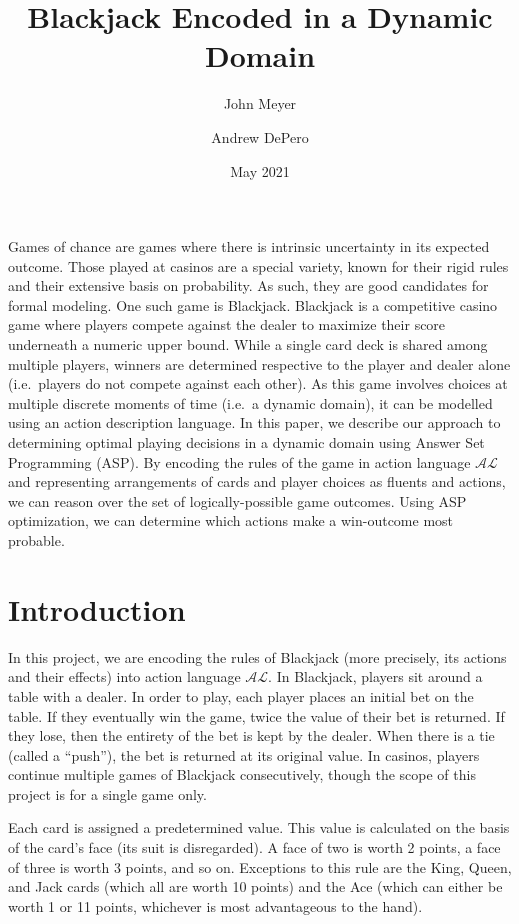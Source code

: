 \documentclass{article}
\title{Blackjack Encoded in a Dynamic Domain}
\author{
    John Meyer
    \and
    Andrew DePero
}
\date{May 2021}
\begin{document}
\maketitle

\noindent
Games of chance are games where there is intrinsic uncertainty in its expected outcome.
Those played at casinos are a special variety, known for their rigid rules and their extensive basis on probability.
As such, they are good candidates for formal modeling.
One such game is Blackjack.
Blackjack is a competitive casino game where players compete against the dealer to maximize their score underneath a numeric upper bound.
While a single card deck is shared among multiple players, winners are determined respective to the player and dealer alone (i.e.~players do not compete against each other).
As this game involves choices at multiple discrete moments of time (i.e.~a dynamic domain), it can be modelled using an action description language.
In this paper, we describe our approach to determining optimal playing decisions in a dynamic domain using Answer Set Programming (ASP).
By encoding the rules of the game in action language $\mathcal{AL}$ and representing arrangements of cards and player choices as fluents and actions, we can reason over the set of logically-possible game outcomes.
Using ASP optimization, we can determine which actions make a win-outcome most probable.

\section{Introduction}

In this project, we are encoding the rules of Blackjack (more precisely, its actions and their effects) into action language $\mathcal{AL}$.
In Blackjack, players sit around a table with a dealer.
In order to play, each player places an initial bet on the table.
If they eventually win the game, twice the value of their bet is returned.
If they lose, then the entirety of the bet is kept by the dealer.
When there is a tie (called a ``push''), the bet is returned at its original value.
In casinos, players continue multiple games of Blackjack consecutively, though the scope of this project is for a single game only.

Each card is assigned a predetermined value.
This value is calculated on the basis of the card's face (its suit is disregarded).
A face of two is worth 2 points, a face of three is worth 3 points, and so on.
Exceptions to this rule are the King, Queen, and Jack cards (which all are worth 10 points) and the Ace (which can either be worth 1 or 11 points, whichever is most advantageous to the hand).
\end{document}
